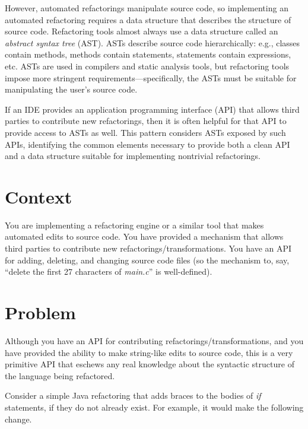 \documentclass[prodmode]{acmlarge}
\begin{document}
However, automated refactorings manipulate source code, so implementing an
automated refactoring requires a data structure that describes the structure of
source code.  Refactoring tools almost always use a data structure called an
\textit{abstract syntax tree} (AST).  ASTs describe source code hierarchically:
e.g., classes contain methods, methods contain statements, statements contain
expressions, etc.  ASTs are used in compilers and static analysis tools, but
refactoring tools impose more stringent requirements---specifically, the ASTs
must be suitable for manipulating the user's source code.

If an IDE provides an application programming interface (API) that allows third
parties to contribute new refactorings, then it is often helpful for that API
to provide access to ASTs as well.  This pattern considers ASTs exposed by such
APIs, identifying the common elements necessary to provide both a clean API and
a data structure suitable for implementing nontrivial refactorings.

\section{Context}

You are implementing a refactoring engine or a similar tool that makes
automated edits to source code.  You have provided a mechanism that allows
third parties to contribute new refactorings/transformations.  You have an API
for adding, deleting, and changing source code files (so the mechanism to, say,
``delete the first 27 characters of \textit{main.c}'' is well-defined).

\section{Problem}
\label{sec:Problem}

Although you have an API for contributing refactorings/transformations, and you
have provided the ability to make string-like edits to source code, this is a
very primitive API that eschews any real knowledge about the syntactic
structure of the language being refactored.

Consider a simple Java refactoring that adds braces to the bodies of
\textit{if} statements, if they do not already exist.  For example, it would
make the following change.
\end{document}
